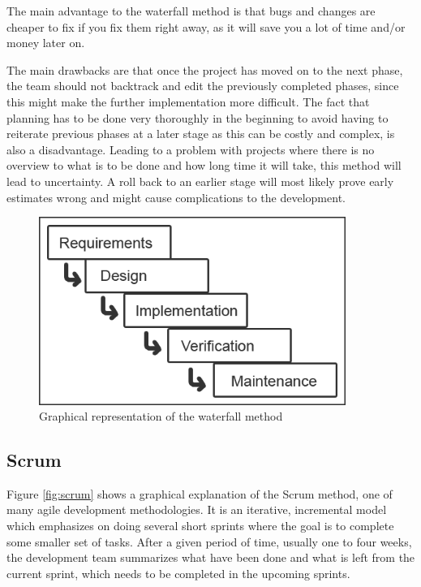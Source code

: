 The main advantage to the waterfall method is that bugs and changes are cheaper to 
fix if you fix them right away, as it will save you a lot of time and/or money later on.

The main drawbacks are that once the project has moved on to 
the next phase, the team should not backtrack and edit the previously completed 
phases, since this might make the further implementation more difficult. The fact 
that planning has to be done very thoroughly in the beginning to avoid having to 
reiterate previous phases at a later stage as this can be costly and complex, is 
also a disadvantage. Leading to a problem with projects where there is no overview 
to what is to be done and how long time it will take, this method will lead to 
uncertainty. A roll back to an earlier stage will most likely prove early estimates 
wrong and might cause complications to the development.

\begin{figure}
	\begin{center}
		\includegraphics[width=10cm]{Pictures/waterfall_model}
	\end{center}
	\caption{Graphical representation of the waterfall method\cite{waterfallmodel}}
	\label{fig:waterfall}
\end{figure}

\subsection{Scrum}
\label{sec:scrum}
Figure \ref{fig:scrum} shows a graphical explanation of the Scrum method, one of many agile 
development methodologies. It is an iterative, incremental 
model which emphasizes on doing several short sprints where the goal is to complete 
some smaller set of tasks. After a given period of time, usually one to four weeks, the 
development team summarizes what have been done and what is left from the current 
sprint, which needs to be completed in the upcoming sprints.

